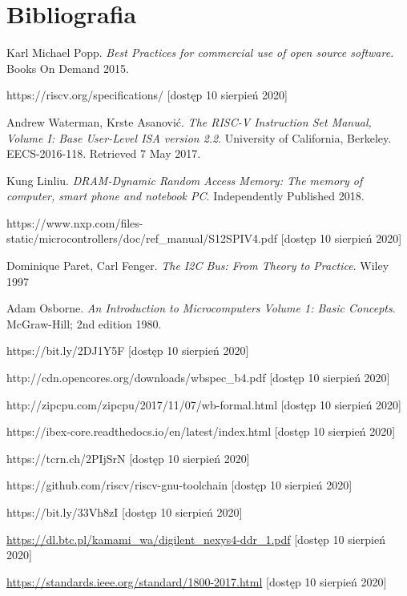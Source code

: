 \documentclass[11pt,a4paper]{article}
\begin{document}
\newpage

\section{Bibliografia}

\begin{thebibliography}{10}

	 Karl Michael Popp. \textit{Best Practices for commercial use of open source software}. Books On Demand  2015.
	
	 https://riscv.org/specifications/ [dostęp 10 sierpień 2020]
	
	 Andrew Waterman, Krste Asanović. \textit{The RISC-V Instruction Set Manual, Volume I: Base User-Level ISA version 2.2}. University of California, Berkeley. EECS-2016-118. Retrieved 7 May 2017.
	
	 Kung Linliu. \textit{DRAM-Dynamic Random Access Memory: The memory of computer, smart phone and notebook PC}. Independently Published 2018.
	
	 https://www.nxp.com/files-static/microcontrollers/doc/ref\_manual/S12SPIV4.pdf [dostęp 10 sierpień 2020]
	
	 	Dominique Paret, Carl Fenger. \textit{The I2C Bus: From Theory to Practice}. Wiley 1997 
	
	 Adam Osborne. \textit{An Introduction to Microcomputers Volume 1: Basic Concepts}. McGraw-Hill; 2nd edition 1980.
	
	 https://bit.ly/2DJ1Y5F [dostęp 10 sierpień 2020]
	
	 http://cdn.opencores.org/downloads/wbspec\_b4.pdf [dostęp 10 sierpień 2020]
	
	 http://zipcpu.com/zipcpu/2017/11/07/wb-formal.html [dostęp 10 sierpień 2020]
	
	 https://ibex-core.readthedocs.io/en/latest/index.html [dostęp 10 sierpień 2020]
	
	 https://tcrn.ch/2PIjSrN [dostęp 10 sierpień 2020]

	 https://github.com/riscv/riscv-gnu-toolchain [dostęp 10 sierpień 2020]
	
	 https://bit.ly/33Vh8zI [dostęp 10 sierpień 2020]
	
	 \url{https://dl.btc.pl/kamami\_wa/digilent\_nexys4-ddr\_1.pdf} [dostęp 10 sierpień 2020]
	
	 \url{https://standards.ieee.org/standard/1800-2017.html} [dostęp 10 sierpień 2020]

\end{thebibliography}
\end{document}
